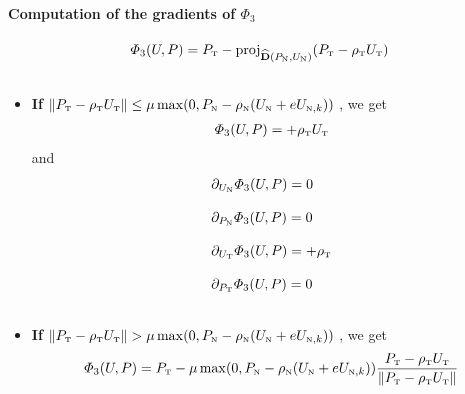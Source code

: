 \paragraph{Computation of the gradients of $\Phi_3$}
\begin{equation}
  \label{eq:AC-TT1}
  \begin{array}{l}
  \varPhi_3(U,P) =  P_{\t} - \proj_{\widehat {\bf D}(P_{\n},U_{\n})} (P_{\t} - \rho_{\t} U_{\t} ) \\ \\
\end{array}
\end{equation}
\begin{itemize}
\item \textbf{If} $\|P_{{\hbox{\tiny{T}}}} - \rho_{{\hbox{\tiny{T}}}} U_{{\hbox{\tiny{T}}}}\| \leq \mu \max (0 ,P_{{\hbox{\tiny{N}}}} - \rho_{{\hbox{\tiny{N}}}} (U_{{\hbox{\tiny{N}}}} +e  U_{{\hbox{\tiny{N}}},k}) ) $  , we get 
\begin{equation}
  \label{eq:AC-TT2}
  \begin{array}{l}
  \varPhi_3(U,P) =  + \rho_{\t} U_{\t} 
\end{array}
\end{equation}
and
 \begin{equation}
    \label{eq:AC-TT3}
    \begin{array}{l}
     \partial_{U_{\n}} \varPhi_3(U,P) =  0 \\ \\
     \partial_{P_{\n}} \varPhi_3(U,P) =  0 \\ \\ 
     \partial_{U_{\t}} \varPhi_3(U,P) =  + \rho_{\t} \\ \\
     \partial_{P_{\t}} \varPhi_3(U,P) =  0 \\ \\ 
    \end{array}
  \end{equation}
\item \textbf{If} $\|P_{{\hbox{\tiny{T}}}} - \rho_{{\hbox{\tiny{T}}}} U_{{\hbox{\tiny{T}}}}\| > \mu \max (0 ,P_{{\hbox{\tiny{N}}}} - \rho_{{\hbox{\tiny{N}}}} (U_{{\hbox{\tiny{N}}}} +e  U_{{\hbox{\tiny{N}}},k}) ) $  , we get 
\begin{equation}
  \label{eq:AC-TT4}
  \begin{array}{l}
  \varPhi_3(U,P) =  P_{\t} - \mu \max(0,P_{\n} - \rho_{\n} (U_{\n} +e  U_{\n,k}) )  \Frac{P_{\t} - \rho_{\t} U_{\t} }{ \| P_{\t} - \rho_{\t} U_{\t}\| }
\end{array}
\end{equation}


\end{itemize}
